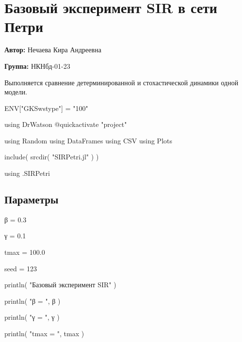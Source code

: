 \documentclass[
  english,
  russian,
  12pt,
  a4paper,
  DIV=11,
  numbers=noendperiod]{scrreprt}
\newenvironment{Shaded}{\begin{snugshade}}{\end{snugshade}}
\newcommand{\BuiltInTok}[1]{\textcolor[rgb]{0.00,0.23,0.31}{#1}}
\newcommand{\ConstantTok}[1]{\textcolor[rgb]{0.56,0.35,0.01}{#1}}
\newcommand{\FloatTok}[1]{\textcolor[rgb]{0.68,0.00,0.00}{#1}}
\newcommand{\FunctionTok}[1]{\textcolor[rgb]{0.28,0.35,0.67}{#1}}
\newcommand{\ImportTok}[1]{\textcolor[rgb]{0.00,0.46,0.62}{#1}}
\newcommand{\NormalTok}[1]{\textcolor[rgb]{0.00,0.23,0.31}{#1}}
\newcommand{\OperatorTok}[1]{\textcolor[rgb]{0.37,0.37,0.37}{#1}}
\newcommand{\PreprocessorTok}[1]{\textcolor[rgb]{0.68,0.00,0.00}{#1}}
\newcommand{\StringTok}[1]{\textcolor[rgb]{0.13,0.47,0.30}{#1}}
\begin{document}
\chapter{Базовый эксперимент SIR в сети
Петри}\label{ux431ux430ux437ux43eux432ux44bux439-ux44dux43aux441ux43fux435ux440ux438ux43cux435ux43dux442-sir-ux432-ux441ux435ux442ux438-ux43fux435ux442ux440ux438}

\textbf{Автор:} Нечаева Кира Андреевна

\textbf{Группа:} НКНбд-01-23

Выполняется сравнение детерминированной и стохастической динамики одной
модели.

\begin{Shaded}
\begin{Highlighting}[]
\ConstantTok{ENV}\NormalTok{[}\StringTok{"GKSwstype"}\NormalTok{] }\OperatorTok{=} \StringTok{"100"}

\ImportTok{using} \BuiltInTok{DrWatson}
\PreprocessorTok{@quickactivate} \StringTok{"project"}

\ImportTok{using} \BuiltInTok{Random}
\ImportTok{using} \BuiltInTok{DataFrames}
\ImportTok{using} \BuiltInTok{CSV}
\ImportTok{using} \BuiltInTok{Plots}

\FunctionTok{include}\NormalTok{(}
    \FunctionTok{srcdir}\NormalTok{(}
        \StringTok{"SIRPetri.jl"}
\NormalTok{    )}
\NormalTok{)}

\ImportTok{using} \BuiltInTok{.SIRPetri}
\end{Highlighting}
\end{Shaded}

\section{Параметры}\label{ux43fux430ux440ux430ux43cux435ux442ux440ux44b}

\begin{Shaded}
\begin{Highlighting}[]
\NormalTok{β }\OperatorTok{=}
    \FloatTok{0.3}

\NormalTok{γ }\OperatorTok{=}
    \FloatTok{0.1}

\NormalTok{tmax }\OperatorTok{=}
    \FloatTok{100.0}

\NormalTok{seed }\OperatorTok{=}
    \FloatTok{123}

\FunctionTok{println}\NormalTok{(}
    \StringTok{"Базовый эксперимент SIR"}
\NormalTok{)}

\FunctionTok{println}\NormalTok{(}
    \StringTok{"β = "}\NormalTok{,}
\NormalTok{    β}
\NormalTok{)}

\FunctionTok{println}\NormalTok{(}
    \StringTok{"γ = "}\NormalTok{,}
\NormalTok{    γ}
\NormalTok{)}

\FunctionTok{println}\NormalTok{(}
    \StringTok{"tmax = "}\NormalTok{,}
\NormalTok{    tmax}
\NormalTok{)}
\end{Highlighting}
\end{Shaded}
\end{document}
